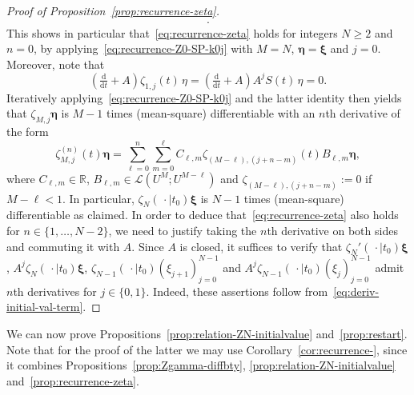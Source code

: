 \documentclass[reqno]{amsart}
\numberwithin{equation}{section}
\newcommand{\R}{\mathbb{R}}
\theoremstyle{remark}
\theoremstyle{definition}
\begin{document}
\begin{proof}[Proof of Proposition~\ref{prop:recurrence-zeta}]
\begin{align}
		\label{eq:recurrence-Z0-SP-k0j}.
	\end{align}
	This shows in particular that~\eqref{eq:recurrence-zeta}
	holds for integers $N \ge 2$ and $n = 0$, 
	by applying~\eqref{eq:recurrence-Z0-SP-k0j} with $M = N$, $\bm\eta = \bm\xi$ and $j = 0$.
	Moreover, note that
	\[
	\left(\tfrac{\mathrm d}{\mathrm dt} + A\right) \zeta_{1,j}(t) \, \eta 
	=
	\left(\tfrac{\mathrm d}{\mathrm dt} + A\right) A^j S(t) \, \eta
	=
	0.
	\]
	Iteratively applying~\eqref{eq:recurrence-Z0-SP-k0j} and the latter identity then
	yields that $\zeta_{M,j}\bm\eta$ is $M-1$ times (mean-square) differentiable
	with an $n$th derivative of the form
	\begin{equation}\label{eq:deriv-initial-val-term}
		\zeta^{(n)}_{M,j}(t) \bm \eta 
		=
		\sum_{\ell=0}^n \sum_{m=0}^\ell C_{\ell,m} \zeta_{(M-\ell),(j+n-m)}(t) B_{\ell, m} \bm \eta,
	\end{equation}
	where $C_{\ell,m} \in \R$, $B_{\ell, m} \in \mathscr L(U^{M}; U^{M-\ell})$ and
	$\zeta_{(M-\ell),(j+n-m)} := 0$ if $M-\ell < 1$.
	In particular, $\zeta_{N}(\,\cdot \mid t_0)\bm{\xi}$ is $N-1$ times (mean-square) differentiable as claimed.
	In order to deduce that~\eqref{eq:recurrence-zeta} also holds for $n \in \{1, \dots, N-2\}$, we need
	to justify taking the $n$th derivative on both sides and commuting
	it with $A$. Since $A$ is closed,
	it suffices to verify that $\zeta_{N}'(\,\cdot \mid t_0)\bm \xi$,
	$A^j \zeta_{N}(\,\cdot \mid t_0)\bm \xi$,
	$\zeta_{N-1}(\,\cdot \mid t_0)  (\xi_{j+1})_{j=0}^{N-1}$ and $A^j \zeta_{N-1}(\,\cdot \mid t_0)  (\xi_{j})_{j=0}^{N-1}$
	admit $n$th derivatives for $j \in \{0,1\}$. Indeed,
	these assertions follow from~\eqref{eq:deriv-initial-val-term}.
\end{proof}
%
We can now prove Propositions~\ref{prop:relation-ZN-initialvalue} and~\ref{prop:restart}.
Note that for the proof of the latter we may use Corollary~\ref{cor:recurrence-}, since it combines
Propositions~\ref{prop:Zgamma-diffbty}, \ref{prop:relation-ZN-initialvalue} and~\ref{prop:recurrence-zeta}.
%
\end{document}
